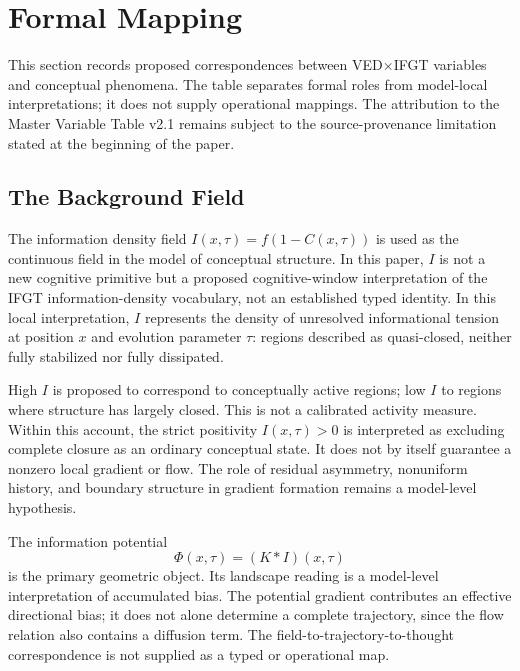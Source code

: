 
\section{Formal Mapping}
\label{sec:formal}

This section records proposed correspondences between VED$\times$IFGT
variables and conceptual phenomena. The table separates formal roles from
model-local interpretations; it does not supply operational mappings.
The attribution to the Master Variable Table v2.1 remains subject to the
source-provenance limitation stated at the beginning of the paper.

\subsection{The Background Field}

The information density field $I(x,\tau) = f(1-C(x,\tau))$ is used as
the continuous field in the model of conceptual structure.
In this paper, $I$ is not a new cognitive primitive but a proposed
cognitive-window interpretation of the IFGT information-density vocabulary,
not an established typed identity.
In this local interpretation, $I$ represents the density of unresolved
informational tension at position $x$ and evolution parameter $\tau$:
regions described as quasi-closed, neither fully stabilized nor fully
dissipated.

High $I$ is proposed to correspond to conceptually active regions; low $I$
to regions where structure has largely closed. This is not a calibrated
activity measure.
Within this account, the strict positivity $I(x,\tau)>0$ is interpreted
as excluding complete closure as an ordinary conceptual state.
It does not by itself guarantee a nonzero local gradient or flow.
The role of residual asymmetry, nonuniform history, and boundary structure
in gradient formation remains a model-level hypothesis.

The information potential
\begin{equation}
  \Phi(x,\tau) = (K * I)(x,\tau)
  \label{eq:Phi_primary}
\end{equation}
is the primary geometric object.
Its landscape reading is a model-level interpretation of accumulated bias.
The potential gradient contributes an effective directional bias; it does
not alone determine a complete trajectory, since the flow relation also
contains a diffusion term. The field-to-trajectory-to-thought correspondence
is not supplied as a typed or operational map.

